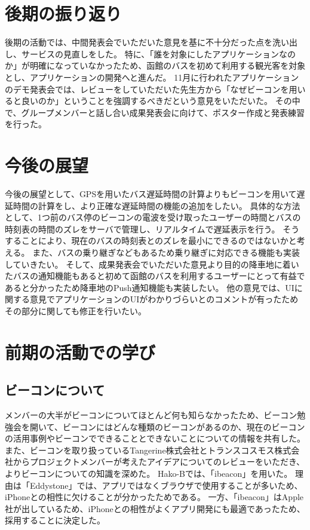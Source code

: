 \documentclass[openany,11pt,papersize]{jsbook}
\begin{document}

\section{後期の振り返り}
後期の活動では、中間発表会でいただいた意見を基に不十分だった点を洗い出し、サービスの見直しをした。
特に、「誰を対象にしたアプリケーションなのか」が明確になっていなかったため、函館のバスを初めて利用する観光客を対象とし、アプリケーションの開発へと進んだ。
11月に行われたアプリケーションのデモ発表会では、レビューをしていただいた先生方から「なぜビーコンを用いると良いのか」ということを強調するべきだという意見をいただいた。
その中で、グループメンバーと話し合い成果発表会に向けて、ポスター作成と発表練習を行った。


\section{今後の展望}
今後の展望として、GPSを用いたバス遅延時間の計算よりもビーコンを用いて遅延時間の計算をし、より正確な遅延時間の機能の追加をしたい。
具体的な方法として、1つ前のバス停のビーコンの電波を受け取ったユーザーの時間とバスの時刻表の時間のズレをサーバで管理し、リアルタイムで遅延表示を行う。
そうすることにより、現在のバスの時刻表とのズレを最小にできるのではないかと考える。
また、バスの乗り継ぎなどもあるため乗り継ぎに対応できる機能も実装していきたい。
そして、成果発表会でいただいた意見より目的の降車地に着いたバスの通知機能もあると初めて函館のバスを利用するユーザーにとって有益であると分かったため降車地のPush通知機能も実装したい。
他の意見では、UIに関する意見でアプリケーションのUIがわかりづらいとのコメントが有ったためその部分に関しても修正を行いたい。



\section{前期の活動での学び}
\subsection{ビーコンについて}
メンバーの大半がビーコンについてほとんど何も知らなかったため、ビーコン勉強会を開いて、ビーコンにはどんな種類のビーコンがあるのか、現在のビーコンの活用事例やビーコンでできることとできないことについての情報を共有した。
また、ビーコンを取り扱っているTangerine株式会社とトランスコスモス株式会社からプロジェクトメンバーが考えたアイデアについてのレビューをいただき、よりビーコンについての知識を深めた。
Hako-Bでは、「ibeacon」を用いた。
理由は「Eddystone」では、アプリではなくブラウザで使用することが多いため、iPhoneとの相性に欠けることが分かったためである。
一方、「ibeacon」はApple社が出しているため、iPhoneとの相性がよくアプリ開発にも最適であったため、採用することに決定した。
\end{document}
